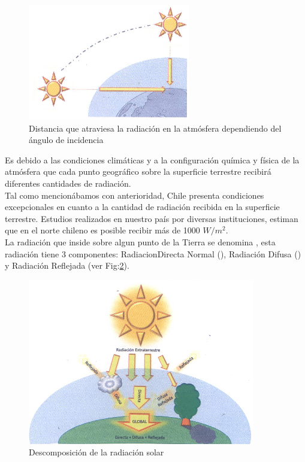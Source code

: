 \begin{figure}[h!]
        \centering
        \includegraphics[scale=0.9]{images/espesorAtmosfera}
        \caption{Distancia que atraviesa la radiación en la atmósfera dependiendo del ángulo de incidencia}
	\label{fig:atmosfera}
\end{figure}

Es debido a las condiciones climáticas y a la configuración química y física de la atmósfera que cada punto geográfico sobre la superficie terrestre recibirá diferentes cantidades de radiación.\\

Tal como mencionábamos con anterioridad, Chile presenta condiciones excepcionales en cuanto a la cantidad de radiación recibida en la superficie terrestre. Estudios realizados en nuestro país por diversas instituciones\cite{recursoSolar:2}, estiman que en el norte chileno es posible recibir más de 1000 $W/{m}^{2}$.\\

La radiación que inside sobre algun punto de la Tierra se denomina , esta radiación tiene 3 componentes: RadiacionDirecta Normal (), Radiación Difusa () y Radiación Reflejada (ver Fig:\ref{fig:componentes}). \\ 

\begin{figure}[h!]
        \centering
        \includegraphics[scale=0.9]{images/radiacionDescompocicion}
        \caption{Descomposición de la radiación solar\cite{recursoSolar:1}}
	\label{fig:componentes}
\end{figure}

